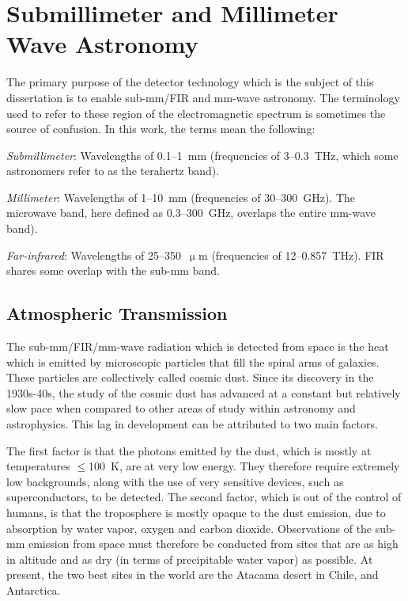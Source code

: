 \section{Submillimeter and Millimeter Wave Astronomy}\label{submillimeter}

The primary purpose of the detector technology which is the subject of this dissertation is to enable sub-mm/FIR and mm-wave astronomy. The terminology used to refer to these region of the electromagnetic spectrum is sometimes the source of confusion. In this work, the terms mean the following:

\vspace{5mm}

\textit{Submillimeter}: Wavelengths of 0.1--1~mm (frequencies of 3--0.3~THz, which some astronomers refer to as the terahertz band).

\vspace{5mm}

\textit{Millimeter}: Wavelengths of 1--10~mm (frequencies of 30--300~GHz). The microwave band, here defined as 0.3--300~GHz, overlaps the entire mm-wave band).

\vspace{5mm}

\textit{Far-infrared}: Wavelengths of 25--350~$\upmu$m (frequencies of 12--0.857~THz). FIR shares some overlap with the sub-mm band.

\subsection{Atmospheric Transmission}

The sub-mm/FIR/mm-wave radiation which is detected from space is the heat which is emitted by microscopic particles that fill the spiral arms of galaxies. These particles are collectively called cosmic dust. Since its discovery in the 1930s-40s, the study of the cosmic dust has advanced at a constant but relatively slow pace when compared to other areas of study within astronomy and astrophysics. This lag in development can be attributed to two main factors.

The first factor is that the photons emitted by the dust, which is mostly at temperatures $\leq$100~K, are at very low energy. They therefore require extremely low backgrounds, along with the use of very sensitive devices, such as superconductors, to be detected. The second factor, which is out of the control of humans, is that the troposphere is mostly opaque to the dust emission, due to absorption by water vapor, oxygen and carbon dioxide. Observations of the sub-mm emission from space must therefore be conducted from sites that are as high in altitude and as dry (in terms of precipitable water vapor) as possible. At present, the two best sites in the world are the Atacama desert in Chile, and Antarctica.

